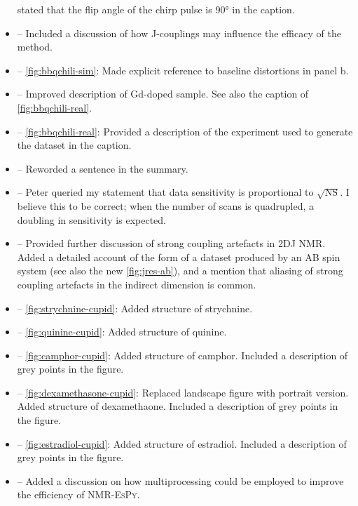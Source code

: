 \documentclass[12pt]{article}
\begin{document}
\begin{itemize}
            stated that the flip angle of the chirp pulse is \ang{90} in the
            caption.
        \item {} -- Included a discussion of how
            J-couplings may influence the efficacy of the method.
        \item {} -- \cref{fig:bbqchili-sim}: Made
            explicit reference to baseline distortions in panel b.
        \item {} -- Improved description of Gd-doped sample.
            See also the caption of \cref{fig:bbqchili-real}.
        \item {} -- \cref{fig:bbqchili-real}:
            Provided a description of the experiment used to generate the
            dataset in the caption.
        \item {} -- Reworded a sentence in the summary.
        \item {} -- Peter queried my statement that data
            sensitivity is proportional to $\sqrt{\text{NS}}$. I believe this
            to be correct; when the number of scans is quadrupled, a doubling
            in sensitivity is expected.
        \item {} -- Provided further discussion
            of strong coupling artefacts in 2DJ NMR. Added a detailed
            account of the form of a dataset produced by an AB spin system (see
            also the new \cref{fig:jres-ab}), and a mention that aliasing of
            strong coupling artefacts in the indirect dimension is common.
        \item {} -- \cref{fig:strychnine-cupid}: Added
            structure of strychnine.
        \item {} -- \cref{fig:quinine-cupid}: Added structure
            of quinine.
        \item {} -- \cref{fig:camphor-cupid}: Added structure
            of camphor. Included a description of grey points in
            the figure.
        \item {} -- \cref{fig:dexamethasone-cupid}:
            Replaced landscape figure with portrait version. Added structure of
            dexamethaone. Included a description of grey points in
            the figure.
        \item {} -- \cref{fig:estradiol-cupid}: Added
            structure of estradiol. Included a description of grey points in
            the figure.
        \item {} -- Added a discussion on how
            multiprocessing could be employed to improve the efficiency of
            \textsc{NMR-EsPy}.
    \end{itemize}
\end{document}
